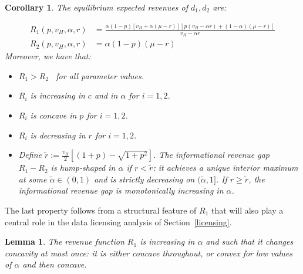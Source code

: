 \documentclass[11pt]{article}
\theoremstyle{plain}
\theoremstyle{definition}
\theoremstyle{plain}
\newtheorem{cor}[thm]{Corollary}
\theoremstyle{plain}
\theoremstyle{plain}
\newtheorem{lem}[thm]{Lemma}
\theoremstyle{plain}
\numberwithin{equation}{section}
\begin{document}
\begin{cor}\label{revenues-comparative}
The equilibrium expected revenues of $ d_1, d_2 $ are:

\begin{align*}
 R_1 (p, v_H, \alpha, r) &= \frac{\alpha (1 - p)\left[ v_H+ \alpha (\mu - r) \right] \left[ p(v_H - \alpha r) + (1 - \alpha)(\mu - r) \right]}{v_H - \alpha r} \\[5pt]
 R_2(p, v_H, \alpha, r) &= \alpha (1 - p) (\mu - r)
\end{align*}
\vspace{0.2cm}
\noindent Moreover, we have that:
\begin{itemize}
    \item[-] $ R_1 > R_2 $ \ for all parameter values.

    \vspace{0.1cm}
    
    \item[-] $ R_i $ is increasing in $ c $ and in $ \alpha $ for $ i = 1,2 $.

    \vspace{0.1cm}

    \item[-] $ R_i $ is concave in $ p $ for $ i = 1,2 $.

    \vspace{0.1cm}

    \item[-] $ R_i $ is decreasing in $ r $ for $ i = 1,2 $.

    \vspace{0.1cm}

    \item[-] Define $\tilde{r} := \frac{v_H}{2}\left[(1+p) - \sqrt{1+p^2}\right]$. The informational revenue gap $R_1 - R_2$ is hump-shaped in $\alpha$ if $r < \tilde{r}$: it achieves a unique interior maximum at some $\tilde{\alpha} \in (0,1)$ and is strictly decreasing on $(\tilde{\alpha}, 1]$. If $r \geq \tilde{r}$, the informational revenue gap is monotonically increasing in $\alpha$.
\end{itemize}
\end{cor}

\vspace{0.4cm}

\noindent The last property follows from a structural feature of $R_1$ that will also play a central role in the data licensing analysis of Section~\ref{licensing}.

\begin{lem}\label{R1-properties}
    The revenue function $R_1$ is increasing in $\alpha$ and such that it changes concavity at most once: it is either concave throughout, or convex for low values of $\alpha$ and then concave.
\end{lem}
\end{document}
